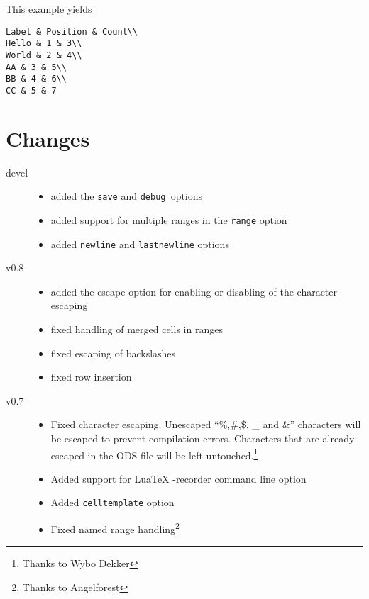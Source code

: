 \documentclass{ltxdoc}
\begin{document}
This example yields

\begin{verbatim}
Label & Position & Count\\
Hello & 1 & 3\\
World & 2 & 4\\
AA & 3 & 5\\
BB & 4 & 6\\
CC & 5 & 7
\end{verbatim}



\section{Changes}

\begin{description}
  \item [devel]
    \begin{itemize}
      \item added the \texttt{save} and \texttt{debug }options
      \item added support for multiple ranges in the \texttt{range} option
      \item added \texttt{newline} and \texttt{lastnewline} options
    \end{itemize}
  \item[v0.8]
    \begin{itemize}
      \item added the escape option for enabling or disabling of the character escaping
      \item fixed handling of merged cells in ranges
      \item fixed escaping of backslashes
      \item fixed row insertion
    \end{itemize}
   \item[v0.7]
     \begin{itemize}
       \item Fixed character escaping. Unescaped ``\%,\#,\$, \_ and \&'' characters will be escaped to prevent compilation errors.
        Characters that are already escaped in the ODS file will be left untouched.\footnote{Thanks to Wybo Dekker} 
         \item Added support for LuaTeX -recorder command line option
       \item Added \texttt{celltemplate} option
       \item Fixed named range handling\footnote{Thanks to Angelforest}
     \end{itemize}


\end{description}
\end{document}
